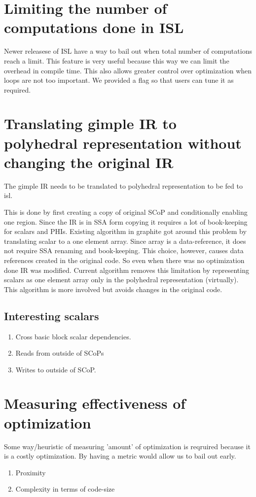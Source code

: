 \section{Limiting the number of computations done in ISL}
Newer releasese of ISL have a way to bail out when total number of computations reach a limit.
This feature is very useful because this way we can limit the overhead in compile time. This also
allows greater control over optimization when loops are not too important. We provided a flag so
that users can tune it as required.


\section{Translating gimple IR to polyhedral representation without changing the original IR}
The gimple IR needs to be translated to polyhedral representation to be fed to isl.

This is done by first creating a copy of original SCoP and conditionally enabling one region.
Since the IR is in SSA form copying it requires a lot of book-keeping for scalars and PHIs.
Existing algorithm in graphite got around this problem by translating scalar to a one element array.
Since array is a data-reference, it does not require SSA renaming and book-keeping. This choice,
however, causes data references created in the original code. So even when there was no optimization done
IR was modified. Current algorithm removes this limitation by representing scalars as one element array only in the
polyhedral representation (virtually). This algorithm is more involved but avoids changes in the original code.

\subsection{Interesting scalars}
\begin{enumerate}
        \item Cross basic block scalar dependencies.
        \item Reads from outside of SCoPs
        \item Writes to outside of SCoP.
\end{enumerate}


\section{Measuring effectiveness of optimization}
Some way/heuristic of measuring 'amount' of optimization is reqruired because it is a costly optimization.
By having a metric would allow us to bail out early.
\begin{enumerate}
  \item Proximity
  \item Complexity in terms of code-size
\end{enumerate}

